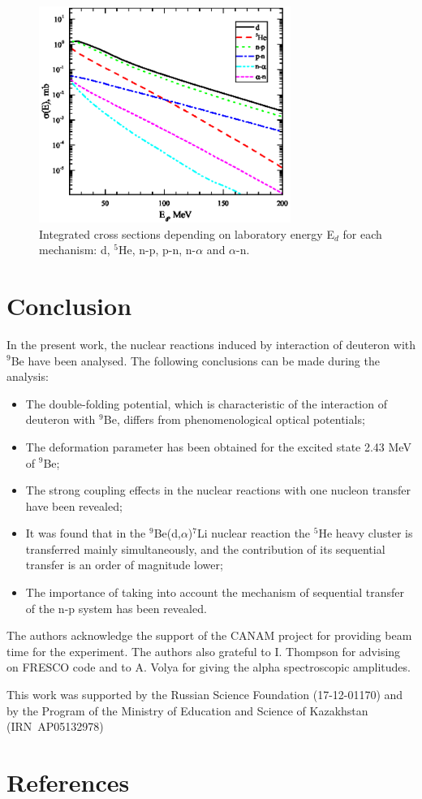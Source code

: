 \documentclass[10pt]{iopart}
\begin{document}
 
 
 
 


\begin{figure}[tp]
\centering
\includegraphics[width=8.2cm]{CS.eps}
\caption{\label{CS} Integrated cross sections depending on laboratory energy E$_d$ for each mechanism: d, $^5$He, n-p, p-n, n-$\alpha$ and $\alpha$-n. }
\end{figure}	
	
\section{Conclusion}
In the present work, the nuclear reactions induced by interaction of deuteron with $^9$Be  have been analysed. The following conclusions can be made during the analysis:
\begin{itemize}
\item The double-folding potential, which is characteristic of the interaction of deuteron with $^9$Be, differs from phenomenological optical potentials;
\item  The deformation parameter has been obtained for the excited state 2.43 MeV of $^9$Be;
\item The strong coupling effects in the nuclear reactions with one nucleon transfer have been revealed;
\item It was found that  in the $^9$Be(d,$\alpha$)$^7$Li nuclear reaction the $^5$He heavy cluster  is transferred mainly simultaneously, and the contribution of its sequential transfer is an order of magnitude lower;
\item The importance of taking into account the mechanism of sequential transfer of the n-p system has been revealed.
\end{itemize}

\ack
	The authors acknowledge the support of the CANAM project \cite{canam} for providing beam time for the experiment. The authors also grateful to I. Thompson for advising on FRESCO code and to A. Volya for giving the alpha spectroscopic amplitudes. 
	
	This work was supported by the Russian Science Foundation (17-12-01170) and by the Program of the Ministry of Education and Science of Kazakhstan (IRN~AP05132978) 



\section*{References}



\end{document}

